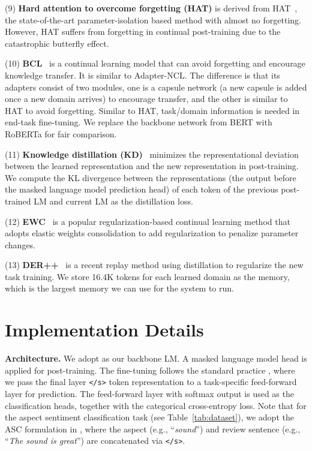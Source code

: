 \documentclass[11pt]{article}
\begin{document}
(9) \textbf{Hard attention to overcome forgetting (HAT)} is derived from HAT~\cite{Serra2018overcoming}, the state-of-the-art parameter-isolation based method with almost no forgetting. {\color{black} However, HAT suffers from forgetting in continual post-training due to the catastrophic butterfly effect.}


(10) \textbf{BCL}~\cite{ke2021adapting} is a continual learning model that can avoid forgetting and encourage knowledge transfer. It is similar to Adapter-NCL. The difference is that its adapters consist of two modules, one is a capsule network (a new capsule is added once a new domain arrives) to encourage transfer, and the other is similar to HAT to avoid forgetting. Similar to HAT, task/domain information is needed in end-task fine-tuning. We replace the backbone network from BERT with RoBERTa for fair comparison. 



(11) \textbf{Knowledge distillation (KD)}~\cite{hinton2015distilling}
minimizes the representational deviation between the learned representation and the new representation in post-training. We
compute the KL divergence between the representations (the output before the masked language model prediction head) of each token of the previous post-trained LM and current LM as the distillation loss.

(12) \textbf{EWC}~\cite{buzzega2020dark} is a popular
regularization-based continual learning method that adopts elastic weights consolidation to add  regularization to penalize parameter changes.

(13) \textbf{DER++}~\cite{buzzega2020dark} is a recent replay method using distillation to regularize the new task training. We store 16.4K tokens for each learned domain as the memory, which is the largest memory we can use for the system to run.

\iffalse
\section{Implementation Details}
\label{sec:imp_detail}

\textbf{Architecture.} We adopt  as our backbone LM. A masked language model head is applied for post-training. The fine-tuning follows the standard practice \cite{DBLP:conf/naacl/DevlinCLT19}, where we pass the final layer \texttt{</s>} token representation to a task-specific feed-forward layer for prediction. The feed-forward layer with softmax output is used as the classification heads, together with the categorical cross-entropy loss. Note that for the aspect sentiment classification task (see Table~\ref{tab:dataset}), we adopt the ASC formulation in \cite{DBLP:conf/naacl/XuLSY19}, where the aspect (e.g., ``\textit{sound}'') and review sentence (e.g., ``\textit{The sound is great}'') are concatenated via \texttt{</s>}. 
\end{document}
